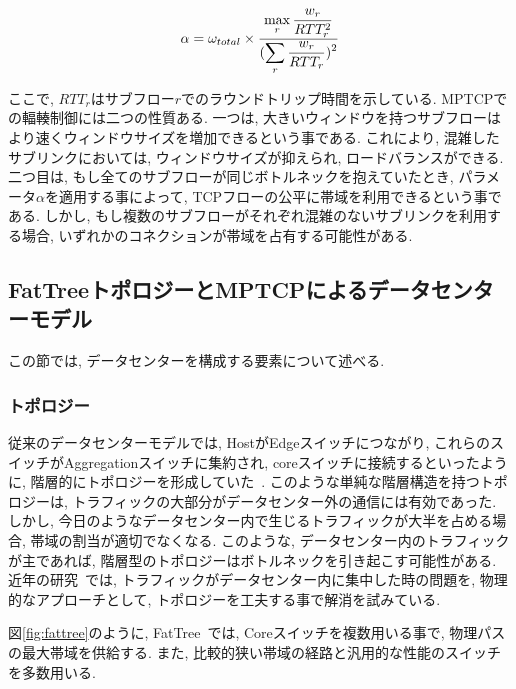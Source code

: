 \documentclass[10pt, a4paper, twocolumn]{jsarticle}
\begin{document}
\vspace{-2mm}
\begin{eqnarray}
 \alpha = \omega_{total} \times
\frac{\displaystyle \max_{r} \frac{w_r}{RTT^2_r}}{\displaystyle
(\sum_{r}\frac{w_r}{RTT_r})^2}
\label{alpha}
\vspace{-2mm}
\end{eqnarray}

ここで, $RTT_r$はサブフロー$r$でのラウンドトリップ時間を示している.
MPTCPでの輻輳制御には二つの性質ある.
一つは, 大きいウィンドウを持つサブフローはより速くウィンドウサイズを増加できるという事である.
これにより, 混雑したサブリンクにおいては, ウィンドウサイズが抑えられ, ロードバランスができる.
二つ目は, もし全てのサブフローが同じボトルネックを抱えていたとき, パラメータ$\alpha$を適用する事によって,
TCPフローの公平に帯域を利用できるという事である.
しかし, もし複数のサブフローがそれぞれ混雑のないサブリンクを利用する場合, いずれかのコネクションが帯域を占有する可能性がある.

\subsection{FatTreeトポロジーとMPTCPによるデータセンターモデル}
\label{sec:fattree}
この節では, データセンターを構成する要素について述べる.
\subsubsection{トポロジー}
\label{subsec:topology}
従来のデータセンターモデルでは, HostがEdgeスイッチにつながり,
これらのスイッチがAggregationスイッチに集約され,
coreスイッチに接続するといったように, 階層的にトポロジーを形成していた~\cite{fattree}.
このような単純な階層構造を持つトポロジーは, トラフィックの大部分がデータセンター外の通信には有効であった.
しかし, 今日のようなデータセンター内で生じるトラフィックが大半を占める場合, 帯域の割当が適切でなくなる.
このような, データセンター内のトラフィックが主であれば, 階層型のトポロジーはボトルネックを引き起こす可能性がある.
近年の研究~\cite{fattree,bcube,vl2}では, トラフィックがデータセンター内に集中した時の問題を, 物理的なアプローチとして,
トポロジーを工夫する事で解消を試みている.

図\ref{fig:fattree}のように, FatTree~\cite{fattree}では, Coreスイッチを複数用いる事で,
物理パスの最大帯域を供給する.
また, 比較的狭い帯域の経路と汎用的な性能のスイッチを多数用いる.
\end{document}
